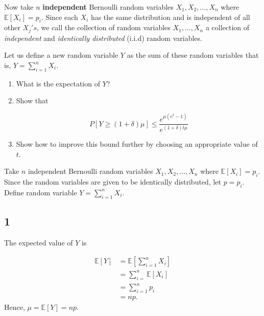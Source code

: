 \begin{tcolorbox}
    Now take $n$ \textbf{independent} Bernoulli random variables $X_1, X_2,
    \ldots, X_n$ where $\mathbb{E}[X_i] = p_i$. Since each $X_i$ has the same
    distribution and is independent of all other $X_j's$, we call the collection
    of random variables $X_1, \ldots, X_n$ a collection of \textit{independent}
    and \textit{identically distributed} (i.i.d) random variables.
    
    Let us define a new random variable $Y$ as the sum of these random variables
    that is, $Y = \sum_{i = 1}^n X_i$.

    \vspace{10pt}
    \begin{enumerate}
        \item What is the expectation of $Y$?
        \item Show that

            \begin{equation*}
                P[Y \ge (1 + \delta) \mu] \le
                \dfrac{e^{\mu(e^t - 1)}}{e^{(1 + \delta) t \mu}}
            \end{equation*}

        \item Show how to improve this bound further by choosing an appropriate
        value of $t$.
    \end{enumerate}
\end{tcolorbox}


Take $n$ independent Bernoulli random variables $X_1, X_2, \ldots, X_n$ where
$\mathbb{E}[X_i]=p_i$. Since the random variables are given to be identically
distributed, let $p=p_i$. Define random variable $Y=\sum_{i=1}^{n}X_i$.

\subsection*{1}

The expected value of $Y$ is 

\begin{equation*}
    \begin{aligned}
        \mathbb{E}[Y] &= \mathbb{E}\left[\sum_{i=1}^{n}X_i\right] \\
        &= \sum_{i=}^{n}\mathbb{E}[X_i] \\
        &= \sum_{i=1}^{n}p_i \\
        &= np.
    \end{aligned}
\end{equation*}
Hence, $\mu=\mathbb{E}[Y]=np$.

